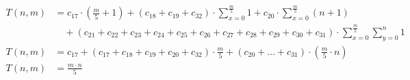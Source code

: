 \begin{subequations}
\begin{align}
\label{eq:findedgels4}
T(n,m)& =
c_{17} \cdot (\frac{m}{5} + 1) + (c_{18} + c_{19} + c_{32}) \cdot \sum_{x=0}^{\frac{m}{5}} 1
 + c_{20} \cdot \sum_{x=0}^{\frac{m}{5}} (n+1) \\
& \quad + (c_{21} + c_{22} + c_{23} + c_{24} + c_{25} + c_{26} + c_{27} + c_{28} + c_{29} + c_{30} + c_{31})
 \cdot \sum_{x=0}^{\frac{m}{5}} \sum_{y=0}^{n} 1 \nonumber \\
\label{eq:findedgels5}
T(n,m)& = c_{17} + (c_{17} + c_{18} + c_{19} + c_{20} + c_{32}) \cdot \frac{m}{5} + (c_{20} + \ldots + c_{31})
\cdot (\frac{m}{5} \cdot n) \\
\label{eq:findedgels6}
T(n,m)& = \frac{m \cdot n}{5}
\end{align}
\end{subequations}
